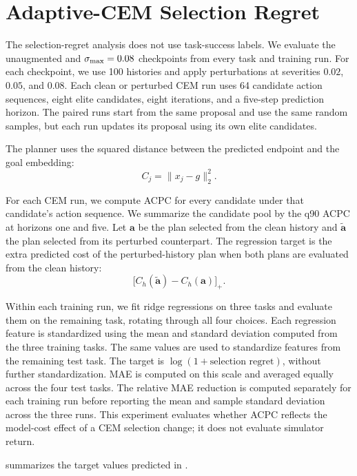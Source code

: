 \FloatBarrier
\section{Adaptive-CEM Selection Regret}
\label{sec:appendix-planner-protocol}

The selection-regret analysis does not use task-success labels. We evaluate
the unaugmented and $\sigma_{\max}{}=0.08$ checkpoints from every task and training
run. For each checkpoint, we use 100 histories and apply perturbations at
severities $0.02$, $0.05$, and $0.08$. Each clean or perturbed CEM run uses 64
candidate action sequences, eight elite candidates, eight iterations, and a
five-step prediction horizon. The paired runs start from the same proposal and
use the same random samples, but each run updates its proposal using its own
elite candidates.

The planner uses the squared distance between the predicted endpoint and the
goal embedding:
\[
C_j=\|x_j-g\|_2^2.
\]

For each CEM run, we compute ACPC for every candidate under that candidate's
action sequence. We summarize the candidate pool by the q90 ACPC at horizons
one and five. Let $\mathbf a$ be the plan selected from the clean history and
$\tilde{\mathbf a}$ the plan selected from its perturbed counterpart. The
regression target is the extra predicted cost of the perturbed-history plan
when both plans are evaluated from the clean history:
\[
\bigl[C_h(\tilde{\mathbf a})-C_h(\mathbf a)\bigr]_+.
\]

Within each training run, we fit ridge regressions on three tasks and evaluate
them on the remaining task, rotating through all four choices.
Each regression feature is standardized using the mean and standard deviation
computed from the three training tasks. The same values are used to standardize
features from the remaining test task. The target is
$\log(1+\text{selection regret})$, without further standardization. MAE is
computed on this scale and averaged equally across the four test tasks.
The relative MAE reduction is computed separately for each
training run before reporting the mean and sample standard deviation across
the three runs. This experiment evaluates whether ACPC reflects the model-cost
effect of a CEM selection change; it does not evaluate simulator return.

 summarizes the target values predicted in
.

